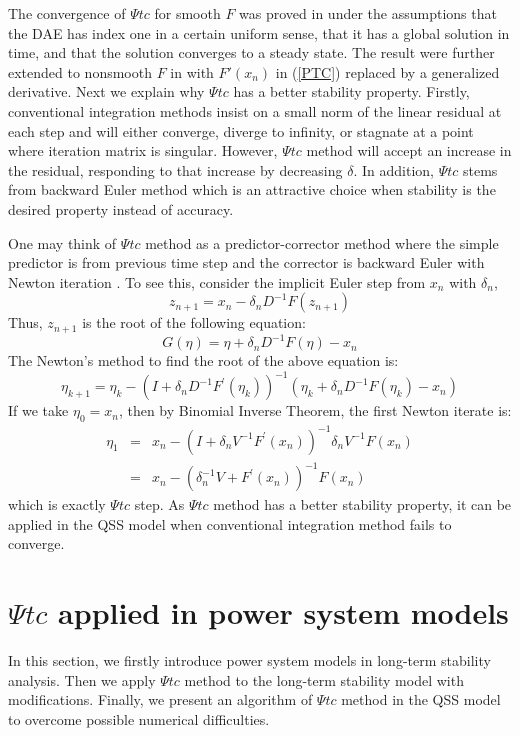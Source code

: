 \documentclass[journal]{IEEEtran}
\begin{document}
The convergence of $\Psi tc$ for smooth $F$ was proved in \cite{Kelley:article2} under the assumptions that the DAE has index one in a certain uniform sense, that it has a global solution in time, and that the solution converges to a steady state. The result were further extended to nonsmooth $F$ in \cite{Kelley:article3} with $F'(x_n)$ in (\ref{PTC}) replaced by a generalized derivative. 
Next we explain why $\Psi tc$ has a better stability property. Firstly, conventional integration methods insist on a small norm of the linear residual at each step and will either converge, diverge to infinity, or stagnate at a point where iteration matrix is singular. However, $\Psi tc$ method will accept an increase in the residual, responding to that increase by decreasing $\delta$\cite{Kelley:article2}. In addition, $\Psi tc$ stems from backward Euler method which is an attractive choice when stability is the desired property instead of accuracy.



One may think of $\Psi tc$ method as a predictor-corrector method where the simple predictor is from previous time step and the corrector is backward Euler with Newton iteration \cite{Kelley:article}. To see this, consider the implicit Euler step from $x_n$ with $\delta_n$,
\begin{equation}
z_{n+1}=x_n-\delta_n D^{-1}F(z_{n+1})
\end{equation}
Thus, $z_{n+1}$ is the root of the following equation:
\begin{equation}
G(\eta)=\eta+\delta_nD^{-1}F(\eta)-x_n\nonumber
\end{equation}
The Newton's method to find the root of the above equation is:
\begin{equation}
\eta_{k+1}=\eta_k-(I+\delta_n D^{-1}F^\prime(\eta_k))^{-1}(\eta_k+\delta_n D^{-1}F(\eta_k)-x_n)\nonumber
\end{equation}
If we take $\eta_0=x_n$, then by Binomial Inverse Theorem, the first Newton iterate is:
\begin{eqnarray}
\eta_1&=&x_n-(I+\delta_n V^{-1}F^\prime(x_n))^{-1}\delta_nV^{-1}F(x_n)\nonumber\\
&=&x_n-(\delta_n^{-1}V+F^\prime(x_n))^{-1}F(x_n)\nonumber
\end{eqnarray}
which is exactly $\Psi tc$ step. As $\Psi tc$ method has a better stability property, it can be applied in the QSS model when conventional integration method fails to converge.

\section{$\Psi tc$ applied in power system models}\label{sectionPTCinpowersystem}
In this section, we firstly introduce power system models in long-term stability analysis. Then we apply $\Psi tc$ method to the long-term stability model with modifications. Finally, we present an algorithm of $\Psi tc$ method in the QSS model to overcome possible numerical difficulties.
\end{document}
